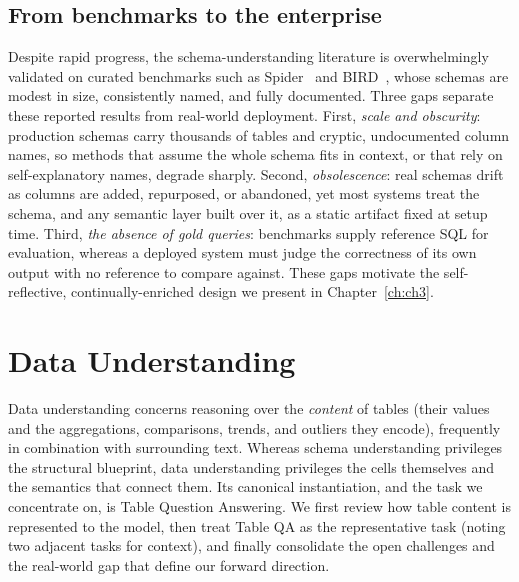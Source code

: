 \subsection{From benchmarks to the enterprise}
Despite rapid progress, the schema-understanding literature is overwhelmingly validated on curated benchmarks such as Spider~\cite{yu2018spider} and BIRD~\cite{li2023bird}, whose schemas are modest in size, consistently named, and fully documented. Three gaps separate these reported results from real-world deployment. First, \emph{scale and obscurity}: production schemas carry thousands of tables and cryptic, undocumented column names, so methods that assume the whole schema fits in context, or that rely on self-explanatory names, degrade sharply. Second, \emph{obsolescence}: real schemas drift as columns are added, repurposed, or abandoned, yet most systems treat the schema, and any semantic layer built over it, as a static artifact fixed at setup time. Third, \emph{the absence of gold queries}: benchmarks supply reference SQL for evaluation, whereas a deployed system must judge the correctness of its own output with no reference to compare against. These gaps motivate the self-reflective, continually-enriched design we present in Chapter~\ref{ch:ch3}.

\section{Data Understanding}
\label{sec:data}
Data understanding concerns reasoning over the \emph{content} of tables (their values and the aggregations, comparisons, trends, and outliers they encode), frequently in combination with surrounding text. Whereas schema understanding privileges the structural blueprint, data understanding privileges the cells themselves and the semantics that connect them. Its canonical instantiation, and the task we concentrate on, is Table Question Answering. We first review how table content is represented to the model, then treat Table QA as the representative task (noting two adjacent tasks for context), and finally consolidate the open challenges and the real-world gap that define our forward direction.

